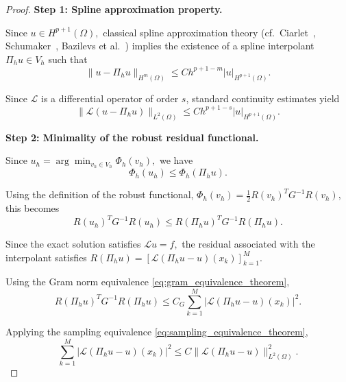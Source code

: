 \documentclass[10pt,a4paper]{amsart}
\begin{document}
\begin{proof}

\noindent
\textbf{Step 1: Spline approximation property.}

Since
$
u\in H^{p+1}(\Omega),
$
classical spline approximation theory
(cf.\ Ciarlet~\cite{ciarlet2002finite},
Schumaker~\cite{schumaker2007spline},
Bazilevs et al.~\cite{bazilevs2006isogeometric})
implies the existence of a spline interpolant
$
\Pi_hu\in V_h
$
such that
\begin{equation}
\|u-\Pi_hu\|_{H^m(\Omega)}
\le
Ch^{p+1-m}
|u|_{H^{p+1}(\Omega)}.
\label{eq:proof_interp}
\end{equation}

Since $\mathcal{L}$ is a differential operator of order $s$,
standard continuity estimates yield
\begin{equation}
\|\mathcal{L}(u-\Pi_hu)\|_{L^2(\Omega)}
\le
Ch^{p+1-s}
|u|_{H^{p+1}(\Omega)}.
\label{eq:proof_operator_error}
\end{equation}


\noindent
\textbf{Step 2: Minimality of the robust residual functional.}

Since
$
u_h
=
\arg\min_{v_h\in V_h}
\Phi_h(v_h),
$
we have
\begin{equation}
\Phi_h(u_h)
\le
\Phi_h(\Pi_hu).
\label{eq:proof_minimality}
\end{equation}

Using the definition of the robust functional,
$
\Phi_h(v_h)
=
\frac12
R(v_h)^TG^{-1}R(v_h),
$
this becomes
\begin{equation}
R(u_h)^TG^{-1}R(u_h)
\le
R(\Pi_hu)^TG^{-1}R(\Pi_hu).
\label{eq:proof_robust_minimality}
\end{equation}

Since the exact solution satisfies
$
\mathcal{L}u=f,
$
the residual associated with the interpolant satisfies
$
R(\Pi_hu)
=
\left[
\mathcal{L}(\Pi_hu-u)(x_k)
\right]_{k=1}^{M}.
$

Using the Gram norm equivalence
\eqref{eq:gram_equivalence_theorem},
\begin{equation}
R(\Pi_hu)^TG^{-1}R(\Pi_hu)
\le
C_G
\sum_{k=1}^{M}
|\mathcal{L}(\Pi_hu-u)(x_k)|^2.
\label{eq:proof_gram_upper}
\end{equation}

Applying the sampling equivalence
\eqref{eq:sampling_equivalence_theorem},
\begin{equation}
\sum_{k=1}^{M}
|\mathcal{L}(\Pi_hu-u)(x_k)|^2
\le
C
\|\mathcal{L}(\Pi_hu-u)\|_{L^2(\Omega)}^2.
\label{eq:proof_sampling}
\end{equation}


\end{proof}
\end{document}
